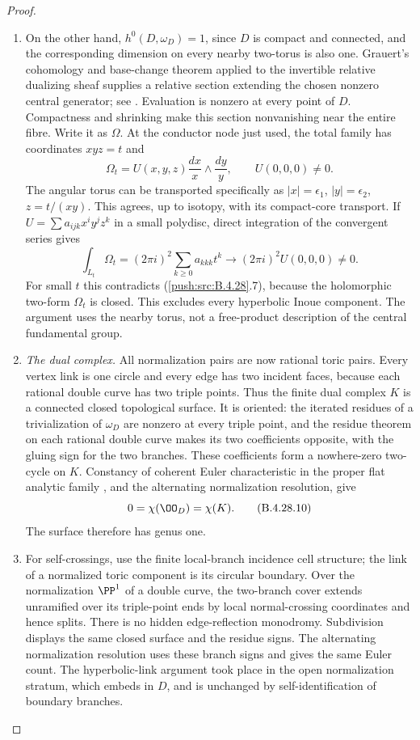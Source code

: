 \begin{proof}
\begin{enumerate}[label=\arabic*.,leftmargin=*]
\item On the other hand, $h^0(D,\omega_D)=1$, since $D$ is
compact and connected, and the corresponding dimension
on every nearby two-torus is also one. Grauert's
cohomology and base-change theorem applied to the
invertible relative dualizing sheaf supplies a relative
section extending the chosen nonzero central generator;
see \citet[Chapter III, Theorem 4.12(ii)]{BS76}.
Evaluation is
nonzero at every point of $D$. Compactness and shrinking
make this section nonvanishing near the entire fibre.
Write it as $\Omega$. At the conductor node just used,
the total family has coordinates $xyz=t$ and
\[
 \Omega_t=U(x,y,z)\frac{dx}{x}\wedge\frac{dy}{y},
 \qquad U(0,0,0)\ne0.                                \tag{B.4.28.8}
\]
The angular torus can be transported specifically as
$|x|=\epsilon_1$, $|y|=\epsilon_2$, $z=t/(xy)$.
This agrees, up to isotopy, with its compact-core
transport. If $U=\sum a_{ijk}x^iy^jz^k$ in a small
polydisc, direct integration of the convergent series
gives
\[
 \int_{L_t}\Omega_t
   =(2\pi i)^2\sum_{k\ge0}a_{kkk}t^k
   \longrightarrow(2\pi i)^2U(0,0,0)\ne0.            \tag{B.4.28.9}
\]
For small $t$ this contradicts (\ref{push:src:B.4.28}.7), because
the holomorphic two-form $\Omega_t$ is closed. This
excludes every hyperbolic Inoue component. The
argument uses the nearby torus, not a free-product
description of the central fundamental group.

\item \emph{The dual complex.}
All normalization pairs are now rational toric pairs.
Every vertex link is one circle and every edge has
two incident faces, because each rational double
curve has two triple points. Thus the finite dual
complex $K$ is a connected closed topological surface.
It is oriented: the iterated residues of a
trivialization of $\omega_D$ are nonzero at every
triple point, and the residue theorem on each rational
double curve makes its two coefficients opposite,
with the gluing sign for the two branches. These
coefficients form a nowhere-zero two-cycle on $K$.
Constancy of coherent Euler characteristic in the
proper flat analytic family
\citep[Chapter III, Theorem 4.12(iii)]{BS76}, and the alternating
normalization resolution, give
\[
 0=\chi(\OO_D)=\chi(K).                              \tag{B.4.28.10}
\]
The surface therefore has genus one.

\item For self-crossings, use the finite local-branch
incidence cell structure; the link of a normalized
toric component is its circular boundary. Over the
normalization $\PP^1$ of a double curve, the two-branch
cover extends unramified over its triple-point ends
by local normal-crossing coordinates and hence splits.
There is no hidden edge-reflection monodromy. Subdivision
displays the same closed surface and the residue signs.
The alternating normalization resolution uses these
branch signs and gives the same Euler count. The
hyperbolic-link argument took place in the open
normalization stratum, which embeds in $D$, and is
unchanged by self-identification of boundary branches.
\end{enumerate}
\end{proof}


